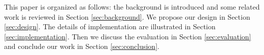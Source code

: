 This paper is organized as follows: the background is introduced and
some related work is reviewed in Section \ref{sec:background}. We propose
our design in Section \ref{sec:design}. The details of implementation
are illustrated in Section \ref{sec:implementation}. Then we discuss
the evaluation in Section \ref{sec:evaluation} and conclude our work
in Section \ref{sec:conclusion}.





